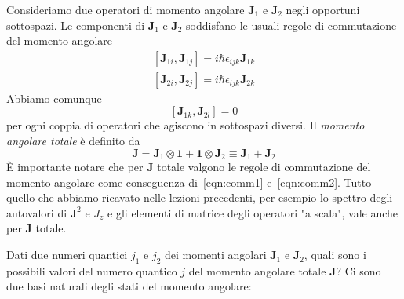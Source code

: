 Consideriamo due operatori di momento angolare $\textbf{J}_1$ e $\textbf{J}_2$ negli opportuni sottospazi. Le componenti di $\textbf{J}_1$ e $\textbf{J}_2$ soddisfano le usuali regole di commutazione del momento angolare
\begin{subequations}
\label{eqn:comm1}
\begin{align}
[\textbf{J}_{1i},\textbf{J}_{1j}]=i\hbar\epsilon_{ijk}\textbf{J}_{1k} \\
[\textbf{J}_{2i},\textbf{J}_{2j}]=i\hbar\epsilon_{ijk}\textbf{J}_{2k}
\end{align}
\end{subequations}
Abbiamo comunque
\begin{equation}
\label{eqn:comm2}
[\textbf{J}_{1k},\textbf{J}_{2l}]=0
\end{equation}
per ogni coppia di operatori che agiscono in sottospazi diversi. Il \textit{momento angolare totale} è definito da
\begin{equation}
\textbf{J}=\textbf{J}_1\otimes\textbf{1}+\textbf{1}\otimes\textbf{J}_2\equiv\textbf{J}_1+\textbf{J}_2
\end{equation}
È importante notare che per \textbf{J} totale valgono le regole di commutazione del momento angolare
come conseguenza di~\eqref{eqn:comm1} e~\eqref{eqn:comm2}. Tutto quello che abbiamo ricavato nelle lezioni precedenti, per esempio lo spettro degli autovalori di $\textbf{J}^2$ e $J_z$ e gli elementi di matrice degli operatori "a scala", vale anche per $\textbf{J}$ totale.

Dati due numeri quantici $j_1$ e $j_2$ dei momenti angolari $\textbf{J}_1$ e $\textbf{J}_2$, quali sono i possibili valori del numero quantico $j$ del momento angolare totale $\textbf{J}$? Ci sono due basi naturali degli stati del momento angolare:

